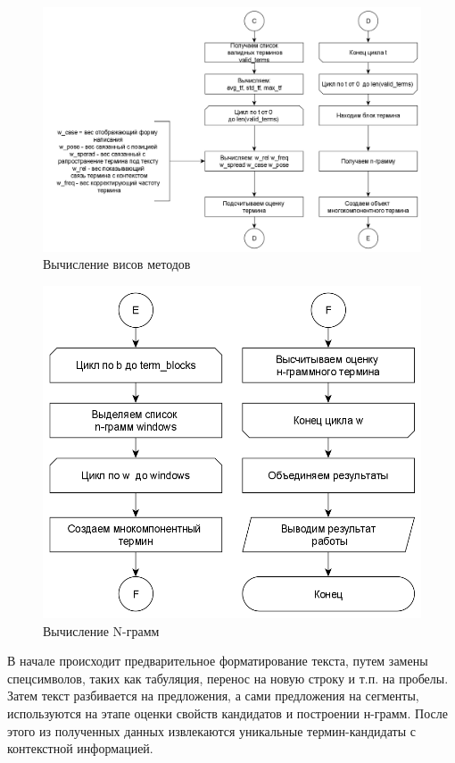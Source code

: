 \begin{figure}[!h]
	\centering
	\includegraphics[width=0.7\linewidth]{src/img/design/yake_2}
	\caption{Вычисление висов методов}
	\label{fig:yake2}
\end{figure}

\begin{figure}[!h]
	\centering
	\includegraphics[width=0.7\linewidth]{src/img/design/yake_3}
	\caption{Вычисление N-грамм}
	\label{fig:yake3}
\end{figure}



В начале происходит предварительное форматирование текста, путем замены спецсимволов, таких как табуляция, перенос на новую строку и т.п. на пробелы.
Затем текст разбивается на предложения, а сами предложения на сегменты, используются на этапе оценки свойств кандидатов и построении н-грамм. 
После этого из полученных данных извлекаются уникальные термин-кандидаты с контекстной информацией.

